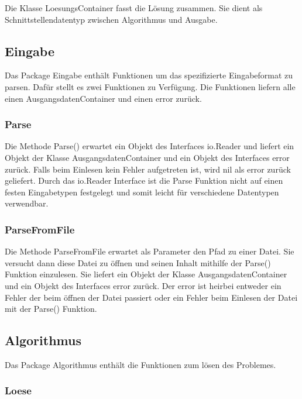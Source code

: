 Die Klasse LoesungsContainer fasst die Lösung zusammen.
Sie dient als Schnittstellendatentyp zwischen Algorithmus und Ausgabe.

\pagebreak

\subsection{Eingabe}

Das Package Eingabe enthält Funktionen um das spezifizierte Eingabeformat zu parsen.
Dafür stellt es zwei Funktionen zu Verfügung.
Die Funktionen liefern alle einen AusgangsdatenContainer und einen error zurück.

\subsubsection{Parse}

Die Methode Parse() erwartet ein Objekt des Interfaces io.Reader und liefert ein Objekt der Klasse AusgangsdatenContainer und ein Objekt des Interfaces error zurück.
Falls beim Einlesen kein Fehler aufgetreten ist, wird nil als error zurück geliefert.
Durch das io.Reader Interface ist die Parse Funktion nicht auf einen festen Eingabetypen festgelegt und somit leicht für verschiedene Datentypen verwendbar.

\subsubsection{ParseFromFile}

Die Methode ParseFromFile erwartet als Parameter den Pfad zu einer Datei.
Sie versucht dann diese Datei zu öffnen und seinen Inhalt mithilfe der Parse() Funktion einzulesen.
Sie liefert ein Objekt der Klasse AusgangsdatenContainer und ein Objekt des Interfaces error zurück.
Der error ist heirbei entweder ein Fehler der beim öffnen der Datei passiert oder ein Fehler beim Einlesen der Datei mit der Parse() Funktion.

\pagebreak

\subsection{Algorithmus}

Das Package Algorithmus enthält die Funktionen zum lösen des Problemes.

\subsubsection{Loese}

